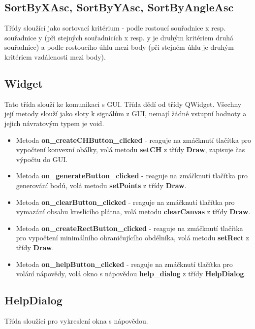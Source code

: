 \documentclass[a4paper, 12pt]{article}
\begin{document}
\subsection{SortByXAsc, SortByYAsc, SortByAngleAsc}
Třídy sloužící jako sortovací kritérium - podle rostoucí souřadnice x resp. souřadnice y (při stejných souřadnicích x resp. y je druhým kritériem druhá souřadnice) a podle rostoucího úhlu mezi body (při stejném úhlu je druhým kritériem vzdálenosti mezi body).
\clearpage

\subsection{Widget}
Tato třída slouží ke komunikaci s GUI. Třída dědí od třídy QWidget. Všechny její metody slouží jako sloty k signálům z GUI, nemají žádné vstupní hodnoty a jejich návratovým typem je void. 

\begin{itemize}
	\item Metoda \textbf{on\_createCHButton\_clicked} - reaguje na zmáčknutí tlačítka pro vypočtení konvexní obálky, volá metodu \textbf{setCH} z třídy \textbf{Draw}, zapisuje čas výpočtu do GUI.

	\item Metoda \textbf{on\_generateButton\_clicked} - reaguje na zmáčknutí tlačítka pro generování bodů, volá metodu \textbf{setPoints} z třídy \textbf{Draw}.

	\item Metoda \textbf{on\_clearButton\_clicked} - reaguje na zmáčknutí tlačítka pro vymazání obsahu kreslícího plátna, volá metodu \textbf{clearCanvas} z třídy \textbf{Draw}.

	\item Metoda \textbf{on\_createRectButton\_clicked} - reaguje na zmáčknutí tlačítka pro vypočtení minimálního ohraničujícího obdélníka, volá metodu \textbf{setRect} z třídy \textbf{Draw}.

	\item Metoda \textbf{on\_helpButton\_clicked} - reaguje na zmáčknutí tlačítka pro volání nápovědy, volá okno s nápovědou \textbf{help\_dialog} z třídy \textbf{HelpDialog}.

\end{itemize} 

\vspace{3cm}
\subsection{HelpDialog}
Třída sloužící pro vykreslení okna s nápovědou.
\end{document}
